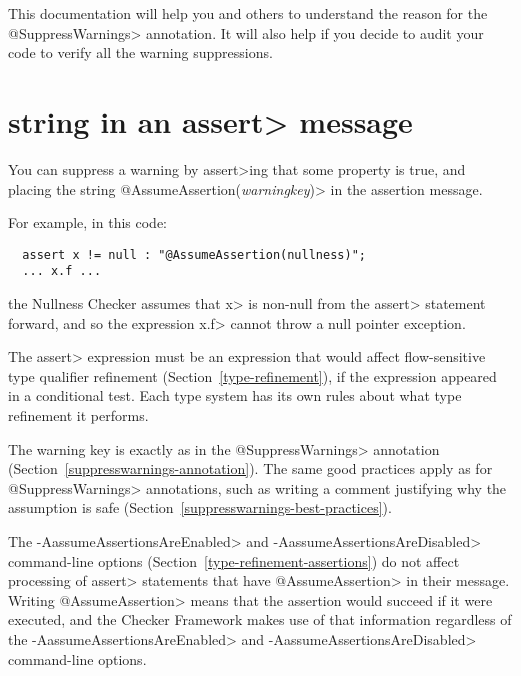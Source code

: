 This documentation will help you and others to understand the reason for
the \<@SuppressWarnings> annotation.  It will also help if you decide to
audit your code to verify all the warning suppressions.


\section{ string in an \<assert> message\label{assumeassertion}}

\begin{sloppypar}
You can suppress a warning by \<assert>ing that some property is true, and
placing the string \<@AssumeAssertion(\emph{warningkey})> in the assertion
message.
\end{sloppypar}

For example, in this code:

\begin{Verbatim}
  assert x != null : "@AssumeAssertion(nullness)";
  ... x.f ...
\end{Verbatim}

\noindent
the Nullness Checker assumes that \<x> is non-null from the \<assert>
statement forward, and so the expression \<x.f> cannot throw a null pointer
exception.

The \<assert> expression must be an expression that would affect flow-sensitive
type qualifier refinement (Section~\ref{type-refinement}), if the
expression appeared in a conditional test.  Each type system has its own
rules about what type refinement it performs.

The warning key is exactly as in the \<@SuppressWarnings> annotation
(Section~\ref{suppresswarnings-annotation}).  The same good practices apply
as for \<@SuppressWarnings> annotations, such as writing a comment
justifying why the assumption is safe
(Section~\ref{suppresswarnings-best-practices}).

The \<-AassumeAssertionsAreEnabled> and \<-AassumeAssertionsAreDisabled>
command-line options (Section~\ref{type-refinement-assertions}) do not
affect processing of \<assert> statements that have \<@AssumeAssertion> in
their message.  Writing \<@AssumeAssertion> means that the assertion would
succeed if it were executed, and the Checker Framework makes use of that
information regardless of the \<-AassumeAssertionsAreEnabled> and
\<-AassumeAssertionsAreDisabled> command-line options.



